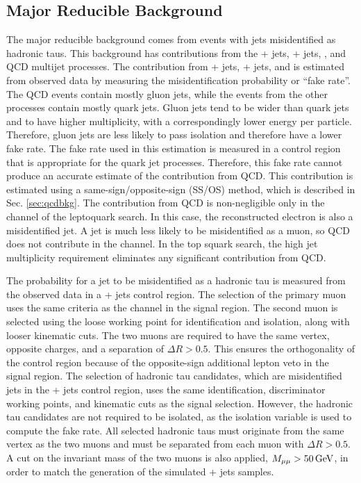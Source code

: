\subsection{Major Reducible Background
\label{sec:faketaubkg}}

The major reducible background comes from events with jets misidentified as hadronic taus. This background has contributions from the \W + jets, \Z + jets, \ttbar, and QCD multijet processes. The contribution from \W + jets, \Z + jets, and \ttbar is estimated from observed data by measuring the misidentification probability or ``fake rate''. The QCD events contain mostly gluon jets, while the events from the other processes contain mostly quark jets. Gluon jets tend to be wider than quark jets and to have higher multiplicity, with a correspondingly lower energy per particle. Therefore, gluon jets are less likely to pass isolation and therefore have a lower fake rate. The fake rate used in this estimation is measured in a control region that is appropriate for the quark jet processes. Therefore, this fake rate cannot produce an accurate estimate of the contribution from QCD. This contribution is estimated using a same-sign/opposite-sign (SS/OS) method, which is described in Sec. \ref{sec:qcdbkg}. The contribution from QCD is non-negligible only in the \etau channel of the leptoquark search. In this case, the reconstructed electron is also a misidentified jet. A jet is much less likely to be misidentified as a muon, so QCD does not contribute in the \mutau channel. In the top squark search, the high jet multiplicity requirement eliminates any significant contribution from QCD.

The probability for a jet to be misidentified as a hadronic tau is measured from the observed data in a \Zmm + jets control region. The selection of the primary muon uses the same criteria as the \mutau channel in the signal region. The second muon is selected using the loose working point for identification and isolation, along with looser kinematic cuts. The two muons are required to have the same vertex, opposite charges, and a separation of $\Delta R > 0.5$. This ensures the orthogonality of the control region because of the opposite-sign additional lepton veto in the signal region. The selection of hadronic tau candidates, which are misidentified jets in the \Zmm + jets control region, uses the same identification, discriminator working points, and kinematic cuts as the signal selection. However, the hadronic tau candidates are not required to be isolated, as the isolation variable is used to compute the fake rate. All selected hadronic taus must originate from the same vertex as the two muons and must be separated from each muon with $\Delta R > 0.5$. A cut on the invariant mass of the two muons is also applied, $M_{\mu\mu} > 50\,\text{Ge\hspace{-.08em}V}$, in order to match the generation of the simulated \Z + jets samples.

